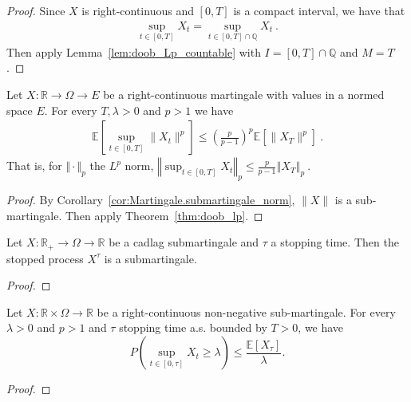 \begin{proof}
Since $X$ is right-continuous and $[0,T]$ is a compact interval, we have that
\begin{align*}
  \sup_{t\in[0,T]}X_t = \sup_{t\in[0,T] \cap \mathbb{Q}}X_t
  \: .
\end{align*}
Then apply Lemma~\ref{lem:doob_Lp_countable} with $I = [0,T] \cap \mathbb{Q}$ and $M = T$.
\end{proof}


\begin{corollary}\label{cor:doob_lp_norm}
  Let $X : \mathbb{R} \rightarrow \Omega\rightarrow E$ be a right-continuous martingale with values in a normed space $E$.
  For every $T, \lambda>0$ and $p>1$ we have
  \begin{align*}
    \mathbb{E}\left[ \sup_{t\in[0,T]} \lVert X_t \rVert ^ p \right]
    \leq \left(\frac{p}{p-1}\right)^p\mathbb{E}[\lVert X_T \rVert ^p]
    \: .
  \end{align*}
  That is, for $\Vert \cdot \Vert_p$ the $L^p$ norm,
  $\left\Vert \sup_{t\in[0,T]}  X_t  \right\Vert_p
    \leq \frac{p}{p-1} \left\Vert X_T \right\Vert_p
    \: .$
\end{corollary}

\begin{proof}
  By Corollary~\ref{cor:Martingale.submartingale_norm}, $\lVert X \rVert$ is a sub-martingale.
  Then apply Theorem~\ref{thm:doob_lp}.
\end{proof}


\begin{lemma}\label{lem:Submartingale.stoppedProcess_of_cadlag}
  Let $X:\mathbb{R}_+ \to \Omega \to \mathbb{R}$ be a cadlag submartingale and $\tau$ a stopping time.
  Then the stopped process $X^\tau$ is a submartingale.
\end{lemma}

\begin{proof}

\end{proof}

\begin{lemma}\label{lem:doob_ineq_stop}
  Let $X:\mathbb{R}\times\Omega\rightarrow \mathbb{R}$ be a right-continuous non-negative sub-martingale.
  For every $\lambda>0$ and $p>1$ and $\tau$ stopping time a.s. bounded by $T>0$, we have
  $$
  P\left( \sup_{t\in[0,\tau]}X_t\geq\lambda \right)\leq \frac{\mathbb{E}[X_\tau]}{\lambda}.
  $$
\end{lemma}
\begin{proof}

\end{proof}


